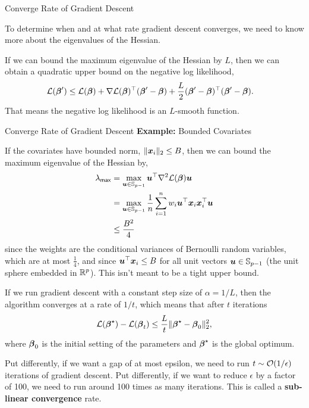 \documentclass[aspectratio=169]{beamer}
\begin{document}
\begin{frame}[t,allowframebreaks]{Converge Rate of Gradient
Descent}\label{converge-rate-of-gradient-descent}

To determine when and at what rate gradient descent converges, we need
to know more about the eigenvalues of the Hessian.

If we can bound the maximum eigenvalue of the Hessian by \(L\), then we
can obtain a quadratic upper bound on the negative log likelihood,
\begin{align*}
\mathcal{L}(\boldsymbol{\beta}') &\leq \mathcal{L}(\boldsymbol{\beta}) + \nabla \mathcal{L}(\boldsymbol{\beta})^\top (\boldsymbol{\beta}' - \boldsymbol{\beta}) + \frac{L}{2} (\boldsymbol{\beta}' - \boldsymbol{\beta})^\top (\boldsymbol{\beta}' - \boldsymbol{\beta}).
\end{align*} That means the negative log likelihood is an \(L\)-smooth
function.
\end{frame}

\begin{frame}[t,allowframebreaks]{Converge Rate of Gradient
    Descent}\label{converge-rate-of-gradient-descent}
\textbf{Example:} Bounded Covariates

If the covariates have bounded norm, \(\|\boldsymbol{x}_i\|_2 \leq B\), then we
can bound the maximum eigenvalue of the Hessian by, \begin{align*}
\lambda_{\mathsf{max}} 
&= \max_{\boldsymbol{u} \in \mathbb{S}_{p-1}} \boldsymbol{u}^\top \nabla^2 \mathcal{L}(\boldsymbol{\beta}) \boldsymbol{u} \\
&= \max_{\boldsymbol{u} \in \mathbb{S}_{p-1}} \frac{1}{n} \sum_{i=1}^n w_i \boldsymbol{u}^\top \boldsymbol{x}_i \boldsymbol{x}_i^\top \boldsymbol{u} \\
&\leq \frac{B^2}{4}
\end{align*} since the weights are the conditional variances of
Bernoulli random variables, which are at most \(\tfrac{1}{4}\), and
since \(\boldsymbol{u}^\top \boldsymbol{x}_i \leq B\) for all unit vectors
\(\boldsymbol{u} \in \mathbb{S}_{p-1}\) (the unit sphere embedded in \(\mathbb{R}^p\)). This
isn't meant to be a tight upper bound. 

If we run gradient descent with a constant step size of
\(\alpha = 1/L\), then the algorithm converges at a rate of \(1/t\),
which means that after \(t\) iterations \begin{align*}
\mathcal{L}(\boldsymbol{\beta}^\star) - \mathcal{L}(\boldsymbol{\beta}_t) \leq \frac{L}{t} \|\boldsymbol{\beta}^\star - \boldsymbol{\beta}_0\|_2^2,
\end{align*} where \(\boldsymbol{\beta}_0\) is the initial setting of the
parameters and \(\boldsymbol{\beta}^\star\) is the global optimum.

Put differently, if we want a gap of at most epsilon, we need to run
\(t \sim \mathcal{O}(1/\epsilon)\) iterations of gradient descent. Put
differently, if we want to reduce \(\epsilon\) by a factor of 100, we
need to run around 100 times as many iterations. This is called a
\textbf{sub-linear convergence} rate.
\end{frame}
\end{document}
